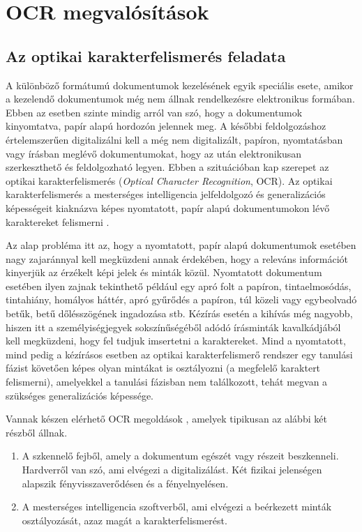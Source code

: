 \section{OCR megvalósítások}

\subsection{Az optikai karakterfelismerés feladata}

A különböző formátumú dokumentumok kezelésének egyik speciális esete, amikor a kezelendő dokumentumok még nem állnak rendelkezésre elektronikus formában. Ebben az esetben szinte mindig arról van szó, hogy a dokumentumok kinyomtatva, papír alapú hordozón jelennek meg. A későbbi feldolgozáshoz értelemszerűen digitalizálni kell a még nem digitalizált, papíron, nyomtatásban vagy írásban meglévő dokumentumokat, hogy az után elektronikusan szerkeszthető és feldolgozható legyen. Ebben a szituációban kap szerepet az optikai karakterfelismerés (\textit{Optical Character Recognition}, OCR). Az optikai karakterfelismerés a mesterséges intelligencia jelfeldolgozó és generalizációs képességeit kiaknázva képes nyomtatott, papír alapú dokumentumokon lévő karaktereket felismerni \cite{liu2013online}.

Az alap probléma itt az, hogy a nyomtatott, papír alapú dokumentumok esetében nagy zajaránnyal kell megküzdeni annak érdekében, hogy a releváns információt kinyerjük az érzékelt képi jelek és minták közül. Nyomtatott dokumentum esetében ilyen zajnak tekinthető például egy apró folt a papíron, tintaelmosódás, tintahiány, homályos háttér, apró gyűrődés a papíron, túl közeli vagy egybeolvadó betűk, betű dőlésszögének ingadozása stb. Kézírás esetén a kihívás még nagyobb, hiszen itt a személyiségjegyek sokszínűségéből adódó írásminták kavalkádjából kell megküzdeni, hogy fel tudjuk imsertetni a karaktereket. Mind a nyomtatott, mind pedig a kézírásos esetben az optikai karakterfelismerő rendszer egy tanulási fázist követően képes olyan mintákat is osztályozni (a megfelelő karaktert felismerni), amelyekkel a tanulási fázisban nem találkozott, tehát megvan a szükséges generalizációs képessége.

Vannak készen elérhető OCR megoldások \cite{tmwebdvi77}, amelyek tipikusan az alábbi két részből állnak.
\begin{enumerate}
\item A szkennelő fejből, amely a dokumentum egészét vagy részeit beszkenneli. Hardverről van szó, ami elvégezi a digitalizálást. Két fizikai jelenségen alapszik fényvisszaverődésen és a fényelnyelésen.
\item  A mesterséges intelligencia szoftverből, ami elvégezi a beérkezett minták osztályozását, azaz magát a karakterfelismerést.
\end{enumerate}

